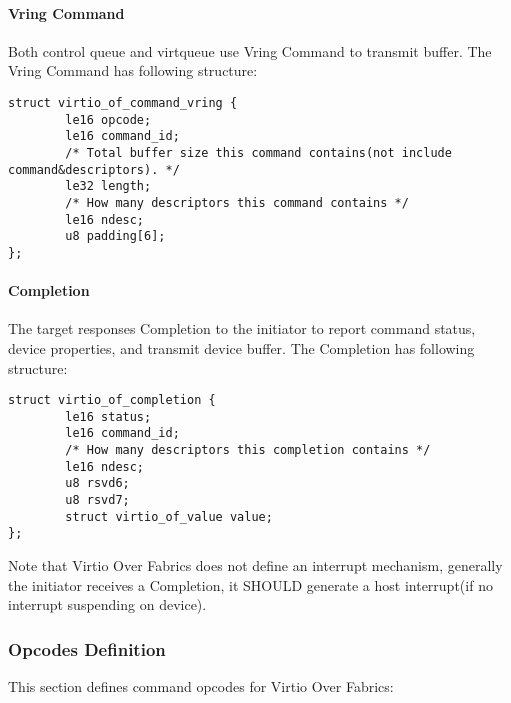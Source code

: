 \paragraph{Vring Command}\label{sec:Virtio Transport Options / Virtio Over Fabrics / Transmission Protocol / Commands Definition / Vring Command}

Both control queue and virtqueue use Vring Command to transmit buffer. The Vring Command has following structure:

\begin{lstlisting}
struct virtio_of_command_vring {
        le16 opcode;
        le16 command_id;
        /* Total buffer size this command contains(not include command&descriptors). */
        le32 length;
        /* How many descriptors this command contains */
        le16 ndesc;
        u8 padding[6];
};
\end{lstlisting}

\paragraph{Completion}\label{sec:Virtio Transport Options / Virtio Over Fabrics / Transmission Protocol / Commands Definition / Completion}

The target responses Completion to the initiator to report command status, device properties, and transmit device buffer. The Completion has following structure:

\begin{lstlisting}
struct virtio_of_completion {
        le16 status;
        le16 command_id;
        /* How many descriptors this completion contains */
        le16 ndesc;
        u8 rsvd6;
        u8 rsvd7;
        struct virtio_of_value value;
};
\end{lstlisting}

Note that Virtio Over Fabrics does not define an interrupt mechanism, generally the initiator receives a Completion, it SHOULD generate a host interrupt(if no interrupt suspending on device).

\subsubsection{Opcodes Definition}\label{sec:Virtio Transport Options / Virtio Over Fabrics / Transmission Protocol / Opcodes Definition}
This section defines command opcodes for Virtio Over Fabrics:

